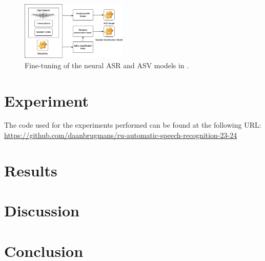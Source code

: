 \documentclass[11pt]{article}
\begin{document}
\begin{figure}
  \centering
  \includegraphics[width=0.45\textwidth]{roddeman_etal_models.png}
  \caption{Fine-tuning of the neural ASR and ASV models in \citet{roddeman2024anonymization}.}
  \label{fig:roddeman_etal_models}
\end{figure}

\section{Experiment}


The code used for the experiments performed can be found at the following URL: \url{https://github.com/daanbrugmans/ru-automatic-speech-recognition-23-24}

\section{Results}

\section{Discussion}

\section{Conclusion}



\appendix
\end{document}
